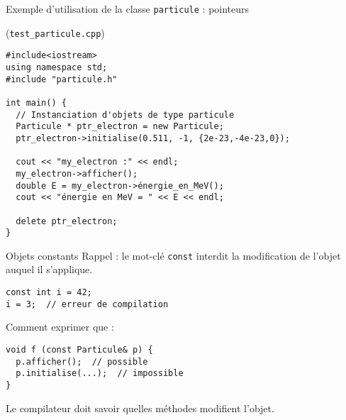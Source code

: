 \documentclass[c]{beamer}
\newcommand{\inline}[1]{\texttt{#1}}
\begin{document}

\begin{frame}[fragile]{Exemple d'utilisation de la classe \texttt{particule} : pointeurs}

\begin{cbox}[][lwuc](\texttt{test\_particule.cpp})
\begin{verbatim}
#include<iostream>
using namespace std;
#include "particule.h"

int main() {
  // Instanciation d'objets de type particule
  Particule * ptr_electron = new Particule;
  ptr_electron->initialise(0.511, -1, {2e-23,-4e-23,0});

  cout << "my_electron :" << endl;
  my_electron->afficher();
  double E = my_electron->énergie_en_MeV();
  cout << "énergie en MeV = " << E << endl;
 
  delete ptr_electron;
}
\end{verbatim}
\end{cbox}

\end{frame}


\begin{frame}[fragile]{Objets constants}
Rappel : le mot-clé \inline{const} interdit la modification de l'objet auquel il s'applique.
\vspace{1em}

\begin{verbatim}
const int i = 42;
i = 3;  // erreur de compilation
\end{verbatim}
\vspace{1em}

\pause
Comment exprimer que :
\begin{verbatim}
void f (const Particule& p) {
  p.afficher();  // possible
  p.initialise(...);  // impossible
}
\end{verbatim}
\vspace{1em}

\pause
Le compilateur doit savoir quelles méthodes modifient l'objet.

\end{frame}

\end{document}
